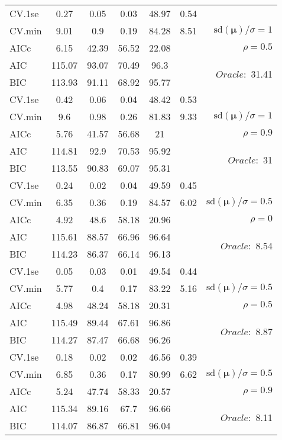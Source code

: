 \begin{table}
\begin{center}
\begin{tabular}{l*{5}{c}|r}
 \hline 
CV.1se & 0.27 & 0.05 & 0.03 & 48.97 & 0.54 & \\
CV.min & 9.01 & 0.9 & 0.19 & 84.28 & 8.51 &  $\mathrm{sd}(\mathbf{\mu})/\sigma=1$ \\
AICc & 6.15 & 42.39 & 56.52 & 22.08 & & $\rho=0.5$ \\
AIC & 115.07 & 93.07 & 70.49 & 96.3 & &  \multirow{2}{*}{$Oracle: $ 31.41} \\
BIC & 113.93 & 91.11 & 68.92 & 95.77 & &  \\
 \hline 
CV.1se & 0.42 & 0.06 & 0.04 & 48.42 & 0.53 & \\
CV.min & 9.6 & 0.98 & 0.26 & 81.83 & 9.33 &  $\mathrm{sd}(\mathbf{\mu})/\sigma=1$ \\
AICc & 5.76 & 41.57 & 56.68 & 21 & & $\rho=0.9$ \\
AIC & 114.81 & 92.9 & 70.53 & 95.92 & &  \multirow{2}{*}{$Oracle: $ 31} \\
BIC & 113.55 & 90.83 & 69.07 & 95.31 & &  \\
 \hline 
CV.1se & 0.24 & 0.02 & 0.04 & 49.59 & 0.45 & \\
CV.min & 6.35 & 0.36 & 0.19 & 84.57 & 6.02 &  $\mathrm{sd}(\mathbf{\mu})/\sigma=0.5$ \\
AICc & 4.92 & 48.6 & 58.18 & 20.96 & & $\rho=0$ \\
AIC & 115.61 & 88.57 & 66.96 & 96.64 & &  \multirow{2}{*}{$Oracle: $ 8.54} \\
BIC & 114.23 & 86.37 & 66.14 & 96.13 & &  \\
 \hline 
CV.1se & 0.05 & 0.03 & 0.01 & 49.54 & 0.44 & \\
CV.min & 5.77 & 0.4 & 0.17 & 83.22 & 5.16 &  $\mathrm{sd}(\mathbf{\mu})/\sigma=0.5$ \\
AICc & 4.98 & 48.24 & 58.18 & 20.31 & & $\rho=0.5$ \\
AIC & 115.49 & 89.44 & 67.61 & 96.86 & &  \multirow{2}{*}{$Oracle: $ 8.87} \\
BIC & 114.27 & 87.47 & 66.68 & 96.26 & &  \\
 \hline 
CV.1se & 0.18 & 0.02 & 0.02 & 46.56 & 0.39 & \\
CV.min & 6.85 & 0.36 & 0.17 & 80.99 & 6.62 &  $\mathrm{sd}(\mathbf{\mu})/\sigma=0.5$ \\
AICc & 5.24 & 47.74 & 58.33 & 20.57 & & $\rho=0.9$ \\
AIC & 115.34 & 89.16 & 67.7 & 96.66 & &  \multirow{2}{*}{$Oracle: $ 8.11} \\
BIC & 114.07 & 86.87 & 66.81 & 96.04 & &  \\
 \hline 
\end{tabular}
\end{center}
\vspace{-1cm}
\end{table}





